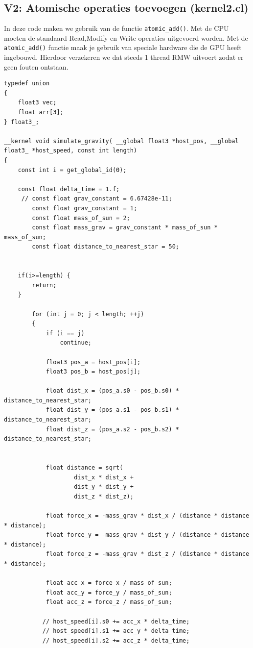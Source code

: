 \documentclass[11pt,a4paper]{article}
\begin{document}
		\subsection{V2: Atomische operaties toevoegen (kernel2.cl)}
		In deze code maken we gebruik van de functie \verb|atomic_add()|. Met de CPU moeten de standaard Read,Modify en Write operaties uitgevoerd worden. Met de \verb|atomic_add()| functie maak je gebruik van speciale hardware die de GPU heeft ingebouwd. Hierdoor verzekeren we dat steeds 1 thread RMW uitvoert zodat er geen fouten ontstaan.
		\begin{lstlisting}[style=CStyle]
		typedef union
{
	float3 vec;
	float arr[3];
} float3_;

__kernel void simulate_gravity( __global float3 *host_pos, __global float3_ *host_speed, const int length)
{
	const int i = get_global_id(0);

	const float delta_time = 1.f;
   	 // const float grav_constant = 6.67428e-11;
    	const float grav_constant = 1;
    	const float mass_of_sun = 2;
    	const float mass_grav = grav_constant * mass_of_sun * mass_of_sun;
    	const float distance_to_nearest_star = 50;


	if(i>=length) {
		return;
	}
	
		for (int j = 0; j < length; ++j)
        {
            if (i == j)
                continue;

            float3 pos_a = host_pos[i];
            float3 pos_b = host_pos[j];

            float dist_x = (pos_a.s0 - pos_b.s0) * distance_to_nearest_star;
            float dist_y = (pos_a.s1 - pos_b.s1) * distance_to_nearest_star;
            float dist_z = (pos_a.s2 - pos_b.s2) * distance_to_nearest_star;


            float distance = sqrt(
                    dist_x * dist_x +
                    dist_y * dist_y +
                    dist_z * dist_z);

            float force_x = -mass_grav * dist_x / (distance * distance * distance);
            float force_y = -mass_grav * dist_y / (distance * distance * distance);
            float force_z = -mass_grav * dist_z / (distance * distance * distance);

            float acc_x = force_x / mass_of_sun;
            float acc_y = force_y / mass_of_sun;
            float acc_z = force_z / mass_of_sun;

           // host_speed[i].s0 += acc_x * delta_time;
           // host_speed[i].s1 += acc_y * delta_time;
           // host_speed[i].s2 += acc_z * delta_time;


\end{lstlisting}
\end{document}
